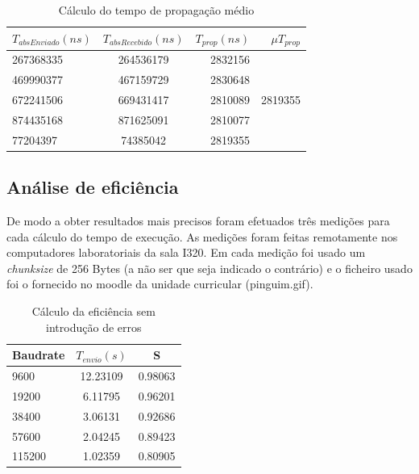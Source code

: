 \documentclass[11pt]{report}
\begin{document}
\begin{table}[h!]
  \begin{center}
    \caption{Cálculo do tempo de propagação médio}
    \label{tab:table1}
    \begin{tabular}{l|c|r|r} %
        \textbf{$T_{absEnviado}(ns)$} &\textbf{$T_{absRecebido}(ns)$} & \textbf{$T_{prop}(ns)$} & \textbf{$\mu T_{prop}$}\\
      \hline
      267368335 & 264536179 & 2832156\\
      469990377 & 467159729 & 2830648\\
        672241506 & 669431417 & 2810089 & 2819355\\
      874435168 & 871625091 & 2810077\\
      77204397 & 74385042 & 2819355\\
    \end{tabular}
  \end{center}
\end{table}

\subsection{Análise de eficiência}

De modo a obter resultados mais precisos foram efetuados três medições
para cada cálculo do tempo de execução. As medições foram feitas remotamente
nos computadores laboratoriais da sala I320. Em cada medição foi usado um
\textit{chunksize} de 256 Bytes (a não ser que seja indicado o contrário)
e o ficheiro usado foi o fornecido no moodle da unidade curricular
(pinguim.gif).
\begin{table}[h!]
  \begin{center}
    \caption{Cálculo da eficiência sem introdução de erros}
    \label{tab:table1}
    \begin{tabular}{l|c|c} %
        Baudrate & \textbf{$  T_{envio} (s) $} & S \\
      \hline
        9600 & 12.23109 & 0.98063\\
        19200 & 6.11795 & 0.96201\\
        38400 & 3.06131 & 0.92686\\
        57600 & 2.04245 & 0.89423\\
        115200 & 1.02359 & 0.80905\\
    \end{tabular}
  \end{center}
\end{table}
\end{document}
